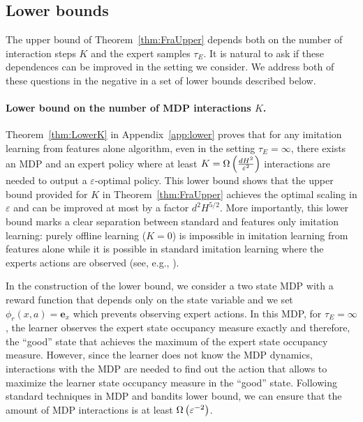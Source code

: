 \subsection{Lower bounds}
The upper bound of Theorem~\ref{thm:FraUpper} depends both on the number of interaction steps $K$ and the expert 
samples $\tau_E$. It is natural to ask if these dependences can be improved in the setting we consider. We address both 
of these questions in the negative in a set of lower bounds described below.



\paragraph{Lower bound on the number of MDP interactions $K$.}
Theorem~\ref{thm:LowerK} in Appendix~\ref{app:lower} proves 
that for any imitation learning from features alone algorithm, even in the setting $\tau_E = \infty$,
there exists an MDP and an expert policy where at least $K=\Omega\left({\frac{d H^2}{\varepsilon^2}}\right)$ interactions 
are needed to output a $\varepsilon$-optimal policy.
This lower bound shows that the upper bound provided for $K$ in Theorem~\ref{thm:FraUpper}
achieves the optimal scaling in $\varepsilon$ and can be improved at most by a factor $ d^2 H^{5/2}$.
More importantly, this lower bound marks a clear separation between standard and features only imitation learning: 
purely offline learning ($K=0$) is impossible in imitation learning from features alone
while it is possible in standard imitation learning 
where the experts actions are observed (see, e.g., \citealp{foster2024behavior}).

In the construction of the lower bound, we consider a two state MDP with a reward 
function that depends only on the state variable and we set $\phi_r(x,a) = \mathbf{e}_x$ which prevents 
observing expert actions. 
In this MDP, for $\tau_E=\infty$, the learner observes the expert state occupancy 
measure exactly and 
therefore, the ``good'' state that achieves the maximum of the expert state occupancy measure.
However, since the learner does not know the MDP dynamics, interactions with the MDP 
are needed to find out the action that allows to maximize the learner state occupancy measure 
in the ``good'' state.
Following standard techniques in MDP and bandits lower bound, we can ensure that the amount 
of MDP interactions is at least $\Omega\left({\varepsilon^{-2}}\right)$.


